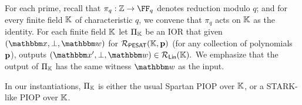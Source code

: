 \documentclass[11pt,letterpaper,usenames,dvipsnames]{article}
\begin{document}
For each prime, recall that $\pi_q:\ZZ\to \FF_q$ denotes reduction modulo $q$; and for every finite field $\mathbb{K}$ of characteristic $q$,  we convene that $\pi_q$ acts on $\mathbb{K}$ as the identity. 
%
%
For each finite field $\mathbb{K}$  let $\Pi_{\mathbb{K}}$ be an IOR that given $(\inp,\bot, \wit)$ for  $\mathcal{R}_{\mathsf{PESAT}}(\mathbb{K},\mathbf{p})$ (for any collection of polynomials $\mathbf{p}$), outputs $(\inp',\bot, \wit) \in \LIN(\KK).$
We emphasize that the output of $\Pi_{\mathbb{K}}$ has the same witness $\wit$ as the input.
 
In our instantiations, $\Pi_{\mathbb{K}}$ is either the usual Spartan \cite{spartan} PIOP over $\mathbb{K}$, or a STARK-like PIOP \cite{ethstark} over $\mathbb{K}$.
\end{document}
